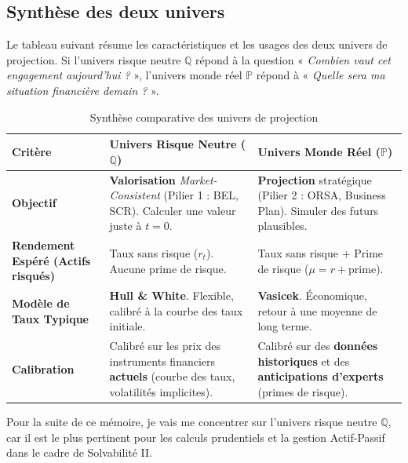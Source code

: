 \subsection{Synthèse des deux univers}

Le tableau suivant résume les caractéristiques et les usages des deux univers de projection. Si l'univers risque neutre $\mathbb{Q}$ répond à la question « \textit{Combien vaut cet engagement aujourd'hui ?} », l'univers monde réel $\mathbb{P}$ répond à « \textit{Quelle sera ma situation financière demain ?} ».

\begin{table}[H]
    \centering
    \caption{Synthèse comparative des univers de projection}
    \label{tab:univers_s2_comp}
    \begin{tabularx}{\textwidth}{l >{\raggedright\arraybackslash}X >{\raggedright\arraybackslash}X}
        \toprule
        \textbf{Critère} & \textbf{\texorpdfstring{Univers Risque Neutre ($\mathbb{Q}$)}{Univers Risque Neutre (Q)}} & \textbf{\texorpdfstring{Univers Monde Réel ($\mathbb{P}$)}{Univers Monde Réel (P)}} \\
        \midrule
        \textbf{Objectif}
        &
        \textbf{Valorisation} \textit{Market-Consistent} (Pilier 1 : BEL, SCR). Calculer une valeur juste à $t=0$.
        &
        \textbf{Projection} stratégique (Pilier 2 : ORSA, Business Plan). Simuler des futurs plausibles. \\
        \addlinespace
        \textbf{Rendement Espéré (Actifs risqués)}
        &
        Taux sans risque ($r_t$). Aucune prime de risque.
        &
        Taux sans risque + Prime de risque ($\mu = r + \text{prime}$). \\
        \addlinespace
        \textbf{Modèle de Taux Typique}
        &
        \textbf{Hull \& White}. Flexible, calibré à la courbe des taux initiale.
        &
        \textbf{Vasicek}. Économique, retour à une moyenne de long terme. \\
        \addlinespace
        \textbf{Calibration}
        &
        Calibré sur les prix des instruments financiers \textbf{actuels} (courbe des taux, volatilités implicites).
        &
        Calibré sur des \textbf{données historiques} et des \textbf{anticipations d'experts} (primes de risque). \\
        \bottomrule
    \end{tabularx}
\end{table}

Pour la suite de ce mémoire, je vais me concentrer sur l'univers risque neutre $\mathbb{Q}$, car il est le plus pertinent pour les calculs prudentiels et la gestion Actif-Passif dans le cadre de Solvabilité II.


